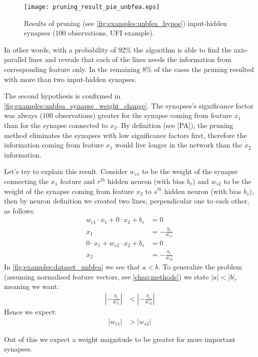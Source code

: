 \begin{figure}[H]
\centering
\texttt{[image: pruning\_result\_pie\_unbfea.eps]}
\caption{Results of pruning (see \cref{fig:examples:unbfea_hypos}) input-hidden synapses (100 observations, UFI example).}
\label{fig:examples:pruning_result_pie_unbfea}
\end{figure}

In other words, with a probability of $ 92\% $ the algorithm is able to find the axis-parallel lines and reveals that each of the lines needs the information from corresponding feature only. In the remaining $ 8\% $ of the cases the pruning resulted with more than two input-hidden synapses.

The second hypothesis is confirmed in \cref{fig:examples:unbfea_synapse_weight_change}. The synapses's significance factor was always (100 observations) greater for the synapse coming from feature $ x_1 $ than for the synapse connected to $ x_2 $. By definition (see [PA]), the pruning method eliminates the synapses with low significance factors first, therefore the information coming from feature $ x_1 $ would live longer in the network than the $ x_2 $ information.

Let's try to explain this result. Consider $ w_{r1} $ to be the weight of the synapse connecting the $ x_1 $ feature and $ r^{th} $ hidden neuron (with bias $ b_r$) and $ w_{s2} $ to be the weight of the synapse coming from feature $ x_2 $ to $ s^{th} $ hidden neuron (with bias $ b_s $), then by neuron definition \citep{article:perceptron} we created two lines, perpendicular one to each other, as follows.
\begin{align}
w_{r1} \cdot x_1 + 0 \cdot x_2 + b_r &= 0 \\
x_1 &= -\frac{b_r}{w_{r1}} \\
0 \cdot x_1 + w_{s2} \cdot x_2 + b_s &= 0 \\
x_2 &= -\frac{b_s}{w_{s2}}
\end{align}
In \cref{fig:examples:dataset_unbfea} we see that $ a < b $. To generalize the problem (assuming normalised feature vectors, see \cref{chap:methods}) we state $ |a| < |b| $, meaning we want:
\begin{align}
|-\frac{b_r}{w_{r1}}| &< |-\frac{b_s}{w_{s2}}|
\end{align}
Hence we expect:
\begin{align}
|w_{r1}| &> |w_{s2}|
\end{align}

Out of this we expect a weight magnitude to be greater for more important synapses.

